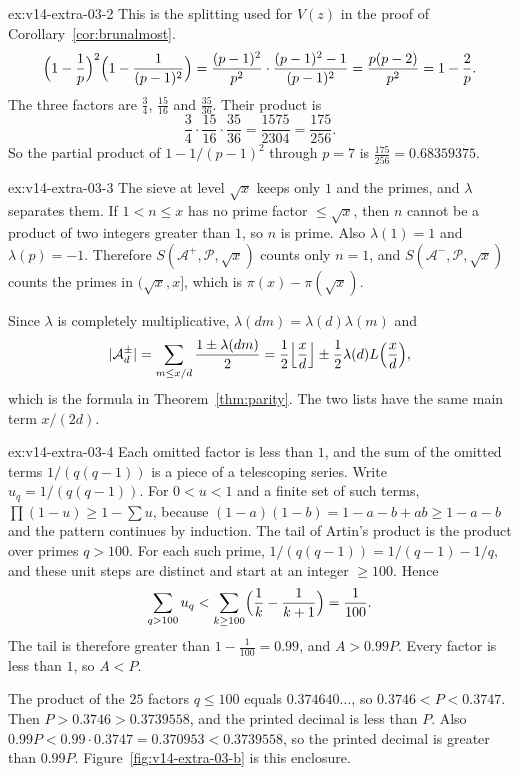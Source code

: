 \begin{solution}{ex:v14-extra-03-2}
\idea This is the splitting used for $V(z)$ in the proof of Corollary~\ref{cor:brunalmost}.
\writeup 
\[
\Bigl(1-\frac1p\Bigr)^2\Bigl(1-\frac1{(p-1)^2}\Bigr)=\frac{(p-1)^2}{p^2}\cdot\frac{(p-1)^2-1}{(p-1)^2}=\frac{p(p-2)}{p^2}=1-\frac2p.
\]
The three factors are $\frac34$, $\frac{15}{16}$ and $\frac{35}{36}$. Their product is
\[
\frac{3}{4}\cdot\frac{15}{16}\cdot\frac{35}{36}=\frac{1575}{2304}=\frac{175}{256}.
\]
So the partial product of $1-1/(p-1)^2$ through $p=7$ is $\frac{175}{256}=0.68359375$.
\end{solution}

\begin{solution}{ex:v14-extra-03-3}
\idea The sieve at level $\sqrt x$ keeps only $1$ and the primes, and $\lambda$ separates them.
\writeup If $1<n\le x$ has no prime factor $\le\sqrt x$, then $n$ cannot be a product of two integers greater than $1$, so $n$ is prime. Also $\lambda(1)=1$ and $\lambda(p)=-1$. Therefore $S(\mathcal A^+,\mathcal P,\sqrt x)$ counts only $n=1$, and $S(\mathcal A^-,\mathcal P,\sqrt x)$ counts the primes in $(\sqrt x,x]$, which is $\pi(x)-\pi(\sqrt x)$.

Since $\lambda$ is completely multiplicative, $\lambda(dm)=\lambda(d)\lambda(m)$ and
\[
|\mathcal A^\pm_d|=\sum_{m\le x/d}\frac{1\pm\lambda(dm)}2=\frac12\Bigl\lfloor\frac xd\Bigr\rfloor\pm\frac12\lambda(d)L\Bigl(\frac xd\Bigr),
\]
which is the formula in Theorem~\ref{thm:parity}. The two lists have the same main term $x/(2d)$.
\end{solution}

\begin{solution}{ex:v14-extra-03-4}
\idea Each omitted factor is less than $1$, and the sum of the omitted terms $1/(q(q-1))$ is a piece of a telescoping series.
\writeup Write $u_q=1/(q(q-1))$. For $0<u<1$ and a finite set of such terms, $\prod(1-u)\ge1-\sum u$, because $(1-a)(1-b)=1-a-b+ab\ge1-a-b$ and the pattern continues by induction. The tail of Artin's product is the product over primes $q>100$. For each such prime, $1/(q(q-1))=1/(q-1)-1/q$, and these unit steps are distinct and start at an integer $\ge100$. Hence
\[
\sum_{q>100}u_q<\sum_{k\ge100}\Bigl(\frac1k-\frac1{k+1}\Bigr)=\frac1{100}.
\]
The tail is therefore greater than $1-\frac1{100}=0.99$, and $A>0.99P$. Every factor is less than $1$, so $A<P$.

The product of the $25$ factors $q\le100$ equals $0.374640\ldots$, so $0.3746<P<0.3747$. Then $P>0.3746>0.3739558$, and the printed decimal is less than $P$. Also $0.99P<0.99\cdot0.3747=0.370953<0.3739558$, so the printed decimal is greater than $0.99P$. Figure~\ref{fig:v14-extra-03-b} is this enclosure.
\end{solution}

